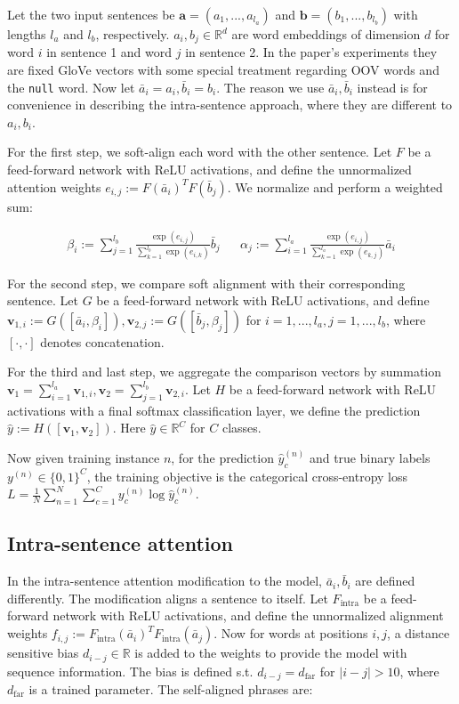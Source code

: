 \documentclass{article}
\begin{document}
Let the two input sentences be $\textbf{a}=(a_1,...,a_{l_a})$ and $\textbf{b}=(b_1,...,b_{l_b})$ with lengths $l_a$ and $l_b$, respectively. $a_i, b_j\in\mathbb{R}^d$ are word embeddings of dimension $d$ for word $i$ in sentence 1 and word $j$ in sentence 2. In the paper's experiments they are fixed GloVe vectors with some special treatment regarding OOV words and the \texttt{null} word. Now let $\bar{a}_i = a_i, \bar{b}_i = b_i$. The reason we use $\bar{a}_i, \bar{b}_i$ instead is for convenience in describing the intra-sentence approach, where they are different to $a_i, b_i$.

For the first step, we soft-align each word with the other sentence. Let $F$ be a feed-forward network with ReLU activations, and define the unnormalized attention weights $e_{i,j} := F(\bar{a}_i)^T F(\bar{b}_j)$. We normalize and perform a weighted sum:

\begin{align*}
    \beta_i := \sum_{j=1}^{l_b} \frac{\exp(e_{i,j})}{\sum_{k=1}^{l_b}\exp(e_{i,k})} \bar{b}_j &&
    \alpha_j := \sum_{i=1}^{l_a} \frac{\exp(e_{i,j})}{\sum_{k=1}^{l_a}\exp(e_{k,j})} \bar{a}_i
\end{align*}

For the second step, we compare soft alignment with their corresponding sentence. Let $G$ be a feed-forward network with ReLU activations, and define $\mathbf{v}_{1,i} := G([\bar{a}_i, \beta_i]), \mathbf{v}_{2,j} := G([\bar{b}_j, \beta_j])$ for $i=1,...,l_a, j=1,...,l_b$, where $[\cdot, \cdot]$ denotes concatenation.

For the third and last step, we aggregate the comparison vectors by summation $\mathbf{v}_1 = \sum_{i=1}^{l_a}\mathbf{v}_{1,i}, \mathbf{v}_2 = \sum_{j=1}^{l_b}\mathbf{v}_{2,i}$. Let $H$ be a feed-forward network with ReLU activations with a final softmax classification layer, we define the prediction $\hat{y} := H([\mathbf{v}_1, \mathbf{v}_2])$. Here $\hat{y}\in\mathbb{R}^C$ for $C$ classes.

Now given training instance $n$, for the prediction $\hat{y}_c^{(n)}$ and true binary labels $y^{(n)}\in\{0, 1\}^C$, the training objective is the categorical cross-entropy loss $L = \frac{1}{N} \sum_{n=1}^N \sum_{c=1}^C y_c^{(n)} \log \hat{y}_c^{(n)}$.

\subsection{Intra-sentence attention}
In the intra-sentence attention modification to the model, $\bar{a}_i, \bar{b}_i$ are defined differently. The modification aligns a sentence to itself. Let $F_\text{intra}$ be a feed-forward network with ReLU activations, and define the unnormalized alignment weights $f_{i,j} := F_\text{intra}(\bar{a}_i)^T F_\text{intra}(\bar{a}_j)$. Now for words at positions $i, j$, a distance sensitive bias $d_{i-j}\in\mathbb{R}$ is added to the weights to provide the model with sequence information. The bias is defined s.t. $d_{i-j} = d_\text{far}$ for $|i-j| > 10$, where $d_\text{far}$ is a trained parameter. The self-aligned phrases are:
\end{document}
